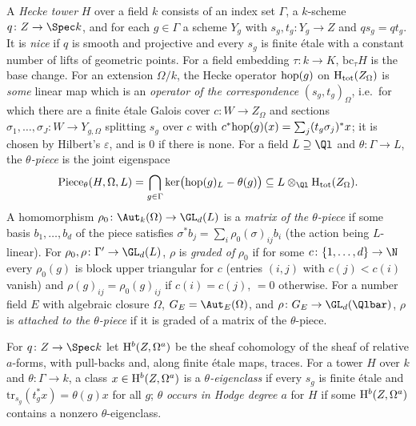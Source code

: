 \begin{definition}\label{pf:steps1:def:tower}
A \emph{Hecke tower} $H$ over a field $k$ consists of an index set $\Gamma$, a $k$-scheme
$q\colon Z\to\Spec k$, and for each $g\in\Gamma$ a scheme $Y_g$ with $s_g,t_g\colon Y_g\to Z$ and
$q s_g=qt_g$. It is \emph{nice} if $q$ is smooth and projective and every $s_g$ is finite \'etale with a
constant number of lifts of geometric points. For a field embedding $\tau\colon k\to K$,
$\mathrm{bc}_\tau H$ is the base change. For an extension $\Omega/k$, the Hecke operator
$\mathrm{hop}(g)$ on $\mathrm{H}_{\mathrm{tot}}(Z_\Omega)$ is \emph{some} linear map which is an \emph{operator of the
correspondence} $(s_g,t_g)_\Omega$, i.e.\ for which there are a finite \'etale Galois cover $c\colon W\to
Z_\Omega$ and sections $\sigma_1,\dots,\sigma_J\colon W\to Y_{g,\Omega}$ splitting $s_g$ over $c$ with
$c^*\mathrm{hop}(g)(x)=\sum_j(t_g\sigma_j)^*x$; it is chosen by Hilbert's $\varepsilon$, and is $0$ if there
is none. For a field $L\supseteq\Ql$ and $\theta\colon\Gamma\to L$, the \emph{$\theta$-piece} is the joint
eigenspace
\[
 \stepsIPiece_\theta(H,\Omega,L)=\bigcap_{g\in\Gamma}\ker\bigl(\stepsIhop(g)_L-\theta(g)\bigr)
 \subseteq L\otimes_{\Ql}\stepsIHtot(Z_\Omega).
\]
A homomorphism $\rho_0\colon\Aut_k(\Omega)\to\GL_d(L)$ is a \emph{matrix of the $\theta$-piece} if some
basis $b_1,\dots,b_d$ of the piece satisfies $\sigma^*b_j=\sum_i\rho_0(\sigma)_{ij}b_i$ (the action being
$L$-linear). For $\rho_0,\rho\colon\Gamma'\to\GL_d(L)$, $\rho$ is \emph{graded of} $\rho_0$ if for some
$c\colon\{1,\dots,d\}\to\N$ every $\rho_0(g)$ is block upper triangular for $c$ (entries $(i,j)$ with
$c(j)<c(i)$ vanish) and $\rho(g)_{ij}=\rho_0(g)_{ij}$ if $c(i)=c(j)$, $=0$ otherwise. For a number field
$E$ with algebraic closure $\Omega$, $G_E=\Aut_E(\Omega)$, and $\rho\colon G_E\to\GL_d(\Qlbar)$, $\rho$ is
\emph{attached to the $\theta$-piece} if it is graded of a matrix of the $\theta$-piece.
 
  
 
 
\end{definition}

\begin{definition}\label{pf:steps1:def:hodge}
For $q\colon Z\to\Spec k$ let $\mathrm{H}^b(Z,\Omega^a)$ be the sheaf cohomology of the sheaf of relative
$a$-forms, with pull-backs and, along finite \'etale maps, traces. For a tower $H$ over $k$ and
$\theta\colon\Gamma\to k$, a class $x\in\mathrm{H}^b(Z,\Omega^a)$ is a \emph{$\theta$-eigenclass} if every
$s_g$ is finite \'etale and $\mathrm{tr}_{s_g}(t_g^*x)=\theta(g)x$ for all $g$; $\theta$ \emph{occurs in Hodge
degree $a$} for $H$ if some $\mathrm{H}^b(Z,\Omega^a)$ contains a nonzero $\theta$-eigenclass.
 
 
\end{definition}

